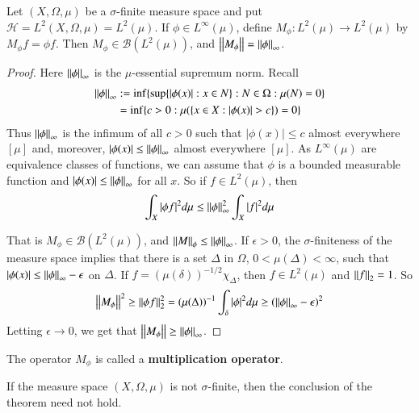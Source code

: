 \begin{thm}
    Let $(X,\Omega,\mu)$ be a $\sigma$-finite measure space and put $\mathscr{H} = L^2(X,\Omega,\mu) = L^2(\mu)$. If $\phi \in L^{\infty}(\mu)$, define $M_{\phi}:L^2(\mu)\rightarrow L^2(\mu)$ by $M_{\phi}f = \phi f$. Then $M_{\phi} \in \mathscr{B}(L^2(\mu))$, and $\left|\left| M_{\phi}\right|\right| = \left|\left| \phi\right|\right|_{\infty}$.
\end{thm}
\begin{proof}
    Here $\left|\left| \phi\right|\right|_{\infty}$ is the $\mu$-essential supremum norm. Recall \begin{align*}
        \left|\left| \phi\right|\right|_{\infty} &:= \inf\{\sup\{|\phi(x)|:x \in N\}:N \in \Omega:\mu(N) = 0\} \\
        &= \inf\{c > 0:\mu(\{x\in X:|\phi(x)| > c\}) = 0\}
    \end{align*}
    Thus $\left|\left| \phi\right|\right|_{\infty}$ is the infimum of all $c > 0$ such that $|\phi(x)| \leq c$ almost everywhere $[\mu]$ and, moreover, $|\phi(x)| \leq \left|\left| \phi\right|\right|_{\infty}$ almost everywhere $[\mu]$. As $L^{\infty}(\mu)$ are equivalence classes of functions, we can assume that $\phi$ is a bounded measurable function and $|\phi(x)| \leq \left|\left| \phi\right|\right|_{\infty}$ for all $x$. So if $f \in L^2(\mu)$, then $$\int_X|\phi f|^2d\mu \leq \left|\left| \phi\right|\right|_{\infty}^2\int_X|f|^2d\mu$$

    That is $M_{\phi} \in \mathscr{B}(L^2(\mu))$, and $\left|\left| M\right|\right|_{\phi} \leq \left|\left| \phi\right|\right|_{\infty}$. If $\epsilon > 0$, the $\sigma$-finiteness of the measure space implies that there is a set $\Delta$ in $\Omega$, $0 < \mu(\Delta) < \infty$, such that $|\phi(x)| \leq \left|\left| \phi\right|\right|_{\infty} - \epsilon$ on $\Delta$. If $f = (\mu(\delta))^{-1/2}\chi_{\Delta}$, then $f \in L^2(\mu)$ and $\left|\left| f\right|\right|_2 = 1$. So $$\left|\left| M_{\phi}\right|\right|^2 \geq \left|\left| \phi f\right|\right|_2^2 = (\mu(\Delta))^{-1}\int_{\delta}|\phi|^2d\mu \geq (\left|\left| \phi\right|\right|_{\infty}-\epsilon)^2$$
    Letting $\epsilon \rightarrow 0$, we get that $\left|\left| M_{\phi}\right|\right|\geq \left|\left| \phi\right|\right|_{\infty}$.
\end{proof}

The operator $M_{\phi}$ is called a \textbf{multiplication operator}.

If the measure space $(X,\Omega,\mu)$ is not $\sigma$-finite, then the conclusion of the theorem need not hold.

